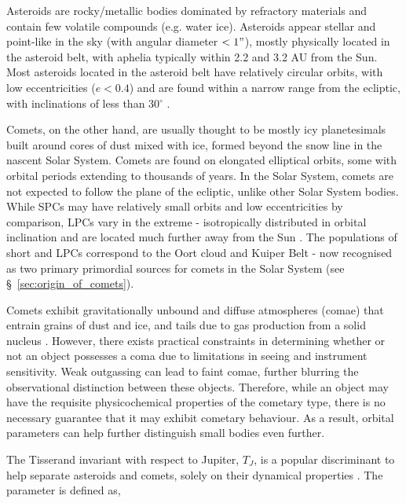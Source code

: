 Asteroids are rocky/metallic bodies dominated by refractory materials and contain few volatile compounds (e.g. water ice). Asteroids appear stellar and point-like in the sky (with angular diameter $< 1"$), mostly physically located in the asteroid belt, with aphelia typically within 2.2 and 3.2 AU from the Sun. Most asteroids located in the asteroid belt have relatively circular orbits, with low eccentricities ($e < 0.4$) and are found within a narrow range from the ecliptic, with inclinations of less than 30$^\circ$ \citep{2002AJ....123.2070T}. 

Comets, on the other hand, are usually thought to be mostly icy planetesimals built around cores of dust mixed with ice, formed beyond the snow line in the nascent Solar System. Comets are found on elongated elliptical orbits, some with orbital periods extending to thousands of years. In the Solar System, comets are not expected to follow the plane of the ecliptic, unlike other Solar System bodies. While SPCs may have relatively small orbits and low eccentricities by comparison, LPCs vary in the extreme - isotropically distributed in orbital inclination and are located much further away from the Sun \citep{DEMEO2008436}. The populations of short and LPCs correspond to the Oort cloud and Kuiper Belt -  now recognised as two primary primordial sources for comets in the Solar System \citep{2017ApJ...845...27N} (see \S~\ref{sec:origin_of_comets}). 

Comets exhibit gravitationally unbound and diffuse atmospheres (comae) that entrain grains of dust and ice, and tails due to gas production from a solid nucleus \citep{1950ApJ...111..375W}. However, there exists practical constraints in determining whether or not an object possesses a coma due to limitations in seeing and instrument sensitivity. Weak outgassing can lead to faint comae, further blurring the observational distinction between these objects. Therefore, while an object may have the requisite physicochemical properties of the cometary type, there is no necessary guarantee that it may exhibit cometary behaviour. As a result, orbital parameters can help further distinguish small bodies even further.


The Tisserand invariant with respect to Jupiter, $T_J$, is a popular discriminant to help separate asteroids and comets, solely on their dynamical properties \citep{1995EM&P...68...71C}. \clearpage The parameter is defined as,

